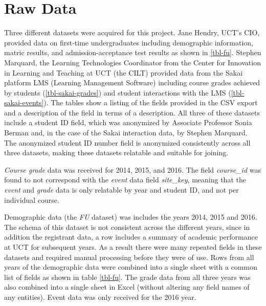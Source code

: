 \section{Raw Data}
Three different datasets were acquired for this project. Jane Hendry, UCT's CIO, provided data on first-time undergraduates including demographic information, matric results, and admission-acceptance test results as shown in \ref{tbl-fu}. Stephen Marquard, the Learning Technologies Coordinator from the Center for Innovation in Learning and Teaching at UCT (the CILT) provided data from the Sakai platform LMS (Learning Management Software) including course grades achieved by students (\ref{tbl-sakai-grades}) and student interactions with the LMS (\ref{tbl-sakai-events}). The tables show a listing of the fields provided in the CSV export and a description of the field in terms of a description. All three of these datasets include a student ID field, which was anonymized by Associate Professor Sonia Berman and, in the case of the Sakai interaction data, by Stephen Marquard. The anonymized student ID number field is anonymized consistently across all three datasets, making these datasets relatable and suitable for joining.

\textit{Course grade} data was received for 2014, 2015, and 2016. The field \textit{course\_id} was found to not correspond with the \textit{event} data field \textit{site\_key}, meaning that the \textit{event} and \textit{grade} data is only relatable by year and student ID, and not per individual course.

Demographic data (the \textit{FU} dataset) was includes the years 2014, 2015 and 2016. The schema of this dataset is not consistent across the different years, since in addition the registrant data, a row includes a summary of academic performance at UCT for subsequent years. As a result there were many repeated fields in these datasets and required manual processing before they were of use. Rows from all years of the demographic data were combined into a single sheet with a common list of fields as shown in table \ref{tbl-fu}. The grade data from all three years was also combined into a single sheet in Excel (without altering any field names of any entities). Event data was only received for the 2016 year.